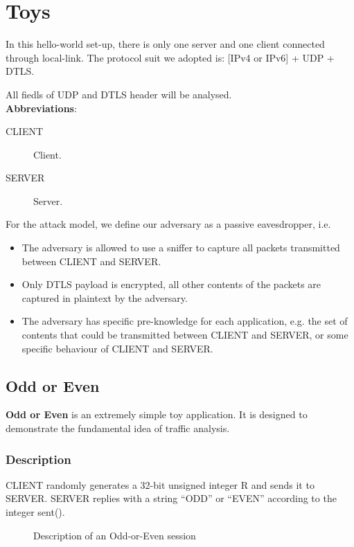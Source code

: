 \chapter{Toys}

In this hello-world set-up, there is only one server and one client connected through local-link. The protocol suit we adopted is: [IPv4 or IPv6] + UDP + DTLS.  

All fiedls of UDP and DTLS header will be analysed.
\\
\textbf{Abbreviations}:
\begin{description}
\item[CLIENT] Client.
\item[SERVER] Server.
\end{description}

For the attack model, we define our adversary as a passive eavesdropper, i.e.
\begin{itemize}
\item The adversary is allowed to use a sniffer to capture all packets transmitted between CLIENT and SERVER.
\item Only DTLS payload is encrypted, all other contents of the packets are captured in plaintext by the adversary.
\item The adversary has specific pre-knowledge for each application, e.g. the set of contents that could be transmitted between CLIENT and SERVER, or some specific behaviour of CLIENT and SERVER.
\end{itemize}

\section{Odd or Even}
\textbf{Odd or Even} is an extremely simple toy application. It is designed to demonstrate the fundamental idea of traffic analysis.

\subsection{Description}
CLIENT randomly generates a 32-bit unsigned integer R and sends it to SERVER. SERVER replies with a string “ODD'' or “EVEN” according to the integer sent().

\begin{figure}[H] 
\centering
\resizebox{8cm}{!}
{}
\caption{Description of an Odd-or-Even session}
\label{Fig: Odd or Even}
\end{figure}

